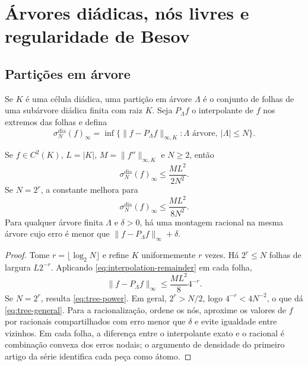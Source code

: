 \section{Árvores diádicas, nós livres e regularidade de Besov}
\label{sec:dyadic-trees}

\subsection{Partições em árvore}

Se $K$ é uma célula diádica, uma partição em árvore $\Lambda$ é o conjunto de folhas de uma subárvore diádica finita com raiz $K$. Seja $P_\Lambda f$ o interpolante de $f$ nos extremos das folhas e defina
\begin{equation}
 \sigma_N^{\mathrm{dia}}(f)_\infty
 =\inf\{\|f-P_\Lambda f\|_{\infty,K}:\Lambda\text{ árvore},\ |\Lambda|\le N\}.
 \label{eq:sigma-dyadic}
\end{equation}

\begin{theorem}\label{thm:tree-rate}
Se $f\in C^2(K)$, $L=|K|$, $M=\|f''\|_{\infty,K}$ e $N\ge2$, então
\begin{equation}
 \sigma_N^{\mathrm{dia}}(f)_\infty\le\frac{ML^2}{2N^2}.
 \label{eq:tree-general}
\end{equation}
Se $N=2^r$, a constante melhora para
\begin{equation}
 \sigma_N^{\mathrm{dia}}(f)_\infty\le\frac{ML^2}{8N^2}.
 \label{eq:tree-power}
\end{equation}
Para qualquer árvore finita $\Lambda$ e $\delta>0$, há uma montagem racional na mesma árvore cujo erro é menor que $\|f-P_\Lambda f\|_\infty+\delta$.
\end{theorem}

\begin{proof}
Tome $r=\lfloor\log_2N\rfloor$ e refine $K$ uniformemente $r$ vezes. Há $2^r\le N$ folhas de largura $L2^{-r}$. Aplicando \eqref{eq:interpolation-remainder} em cada folha,
\[
 \|f-P_\Lambda f\|_\infty\le\frac{ML^2}{8}4^{-r}.
\]
Se $N=2^r$, resulta \eqref{eq:tree-power}. Em geral, $2^r>N/2$, logo $4^{-r}<4N^{-2}$, o que dá \eqref{eq:tree-general}. Para a racionalização, ordene os nós, aproxime os valores de $f$ por racionais compartilhados com erro menor que $\delta$ e evite igualdade entre vizinhos. Em cada folha, a diferença entre o interpolante exato e o racional é combinação convexa dos erros nodais; o argumento de densidade do primeiro artigo da série identifica cada peça como átomo.
\end{proof}

